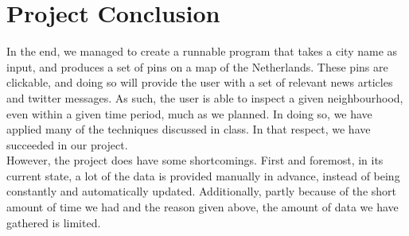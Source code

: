 \section{Project Conclusion}
In the end, we managed to create a runnable program that takes a city name as input, and produces a set of pins on a map of the Netherlands.
These pins are clickable, and doing so will provide the user with a set of relevant news articles and twitter messages.
As such, the user is able to inspect a given neighbourhood, even within a given time period, much as we planned.
In doing so, we have applied many of the techniques discussed in class.
In that respect, we have succeeded in our project. \\
However, the project does have some shortcomings.
First and foremost, in its current state, a lot of the data is provided manually in advance, instead of being constantly and automatically updated.
Additionally, partly because of the short amount of time we had and the reason given above, the amount of data we have gathered is limited.